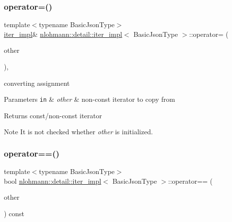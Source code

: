 \subsubsection{\texorpdfstring{operator=()}{operator=()}\hspace{0.1cm}{\footnotesize\ttfamily [2/2]}}
{\footnotesize\ttfamily template$<$typename Basic\+Json\+Type$>$ \\
\mbox{\hyperlink{classnlohmann_1_1detail_1_1iter__impl}{iter\+\_\+impl}}\& \mbox{\hyperlink{classnlohmann_1_1detail_1_1iter__impl}{nlohmann\+::detail\+::iter\+\_\+impl}}$<$ Basic\+Json\+Type $>$\+::operator= (\begin{DoxyParamCaption}\item[{const \mbox{\hyperlink{classnlohmann_1_1detail_1_1iter__impl}{iter\+\_\+impl}}$<$ typename std\+::remove\+\_\+const$<$ Basic\+Json\+Type $>$\+::type $>$ \&}]{other }\end{DoxyParamCaption})\hspace{0.3cm}{\ttfamily [inline]}, {\ttfamily [noexcept]}}



converting assignment 


\begin{DoxyParams}[1]{Parameters}
\mbox{\tt in}  & {\em other} & non-\/const iterator to copy from \\
\hline
\end{DoxyParams}
\begin{DoxyReturn}{Returns}
const/non-\/const iterator 
\end{DoxyReturn}
\begin{DoxyNote}{Note}
It is not checked whether {\itshape other} is initialized. 
\end{DoxyNote}
\mbox{\label{classnlohmann_1_1detail_1_1iter__impl_a2b592605b63ae7f5401996ffa3b14393}} 
\subsubsection{\texorpdfstring{operator==()}{operator==()}}
{\footnotesize\ttfamily template$<$typename Basic\+Json\+Type$>$ \\
bool \mbox{\hyperlink{classnlohmann_1_1detail_1_1iter__impl}{nlohmann\+::detail\+::iter\+\_\+impl}}$<$ Basic\+Json\+Type $>$\+::operator== (\begin{DoxyParamCaption}\item[{const \mbox{\hyperlink{classnlohmann_1_1detail_1_1iter__impl}{iter\+\_\+impl}}$<$ Basic\+Json\+Type $>$ \&}]{other }\end{DoxyParamCaption}) const\hspace{0.3cm}{\ttfamily [inline]}}



